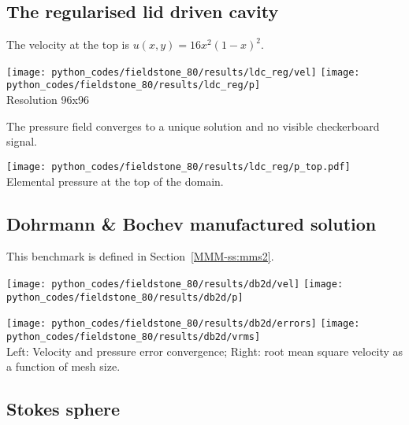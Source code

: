 \subsection*{The regularised lid driven cavity}

The velocity at the top is $u(x,y)=16x^2(1-x)^2$. 

\begin{center}
\texttt{[image: python\_codes/fieldstone\_80/results/ldc\_reg/vel]}
\texttt{[image: python\_codes/fieldstone\_80/results/ldc\_reg/p]}\\
{\captionfont Resolution 96x96}
\end{center}

The pressure field converges to a unique solution and no visible checkerboard signal.
\begin{center}
\texttt{[image: python\_codes/fieldstone\_80/results/ldc\_reg/p\_top.pdf]}\\
{\captionfont Elemental pressure at the top of the domain.}
\end{center}



\subsection*{Dohrmann \& Bochev manufactured solution}

This benchmark is defined in Section~\ref{MMM-ss:mms2}.

\begin{center}
\texttt{[image: python\_codes/fieldstone\_80/results/db2d/vel]}
\texttt{[image: python\_codes/fieldstone\_80/results/db2d/p]}
\end{center}


\begin{center}
\texttt{[image: python\_codes/fieldstone\_80/results/db2d/errors]}
\texttt{[image: python\_codes/fieldstone\_80/results/db2d/vrms]}\\
{\captionfont Left: Velocity and pressure error convergence; Right: root mean square velocity
as a function of mesh size.}
\end{center}


\subsection*{Stokes sphere}

